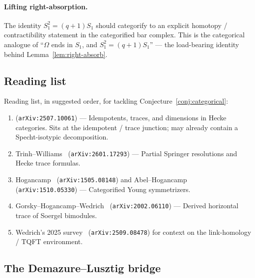 \documentclass[11pt]{article}
\theoremstyle{definition}
\newcommand{\Om}{\Omega}
\begin{document}
\paragraph{Lifting right-absorption.}  The identity $S_1^2 = (q+1) S_1$ should categorify to an explicit homotopy / contractibility statement in the categorified bar complex.  This is the categorical analogue of ``$\Om$ ends in $S_1$, and $S_1^2 = (q+1) S_1$'' --- the load-bearing identity behind Lemma~\ref{lem:right-absorb}.

\subsection{Reading list}

Reading list, in suggested order, for tackling Conjecture~\ref{conj:categorical}:
\begin{enumerate}[label=(\arabic*),topsep=2pt,itemsep=2pt]
\item \cite{idempotentsTraceHecke2025} (\texttt{arXiv:2507.10061}) --- Idempotents, traces, and dimensions in Hecke categories.  Sits at the idempotent / trace junction; may already contain a Specht-isotypic decomposition.
\item Trinh--Williams~\cite{trinhwilliams2026} (\texttt{arXiv:2601.17293}) --- Partial Springer resolutions and Hecke trace formulas.
\item Hogancamp~\cite{hogancamp2015symmetrizers} (\texttt{arXiv:1505.08148}) and Abel--Hogancamp~\cite{abelhogancamp2015} (\texttt{arXiv:1510.05330}) --- Categorified Young symmetrizers.
\item Gorsky--Hogancamp--Wedrich~\cite{ghw2020derived} (\texttt{arXiv:2002.06110}) --- Derived horizontal trace of Soergel bimodules.
\item Wedrich's 2025 survey~\cite{wedrich2025survey} (\texttt{arXiv:2509.08478}) for context on the link-homology / TQFT environment.
\end{enumerate}

\subsection{The Demazure--Lusztig bridge}\label{sec:dl-bridge}
\end{document}

